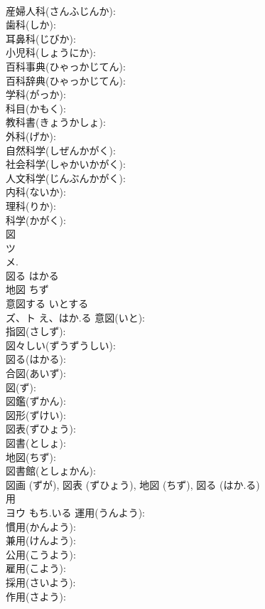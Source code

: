 \documentclass[8pt]{extreport}
\begin{document}
\begin{CJK}{UTF8}{min}
\\	産婦人科(さんふじんか): 
\\	歯科(しか): 
\\	耳鼻科(じびか): 
\\	小児科(しょうにか): 
\\	百科事典(ひゃっかじてん): 
\\	百科辞典(ひゃっかじてん): 
\\	学科(がっか): 
\\	科目(かもく): 
\\	教科書(きょうかしょ): 
\\	外科(げか): 
\\	自然科学(しぜんかがく): 
\\	社会科学(しゃかいかがく): 
\\	人文科学(じんぶんかがく): 
\\	内科(ないか): 
\\	理科(りか): 
\\	科学(かがく): 
\\	図			
\\	ツ 
\\	メ. 
\\	図る はかる 
\\	地図 ちず 
\\	意図する いとする 
\\	ズ、ト	え、はか.る	意図(いと): 
\\	指図(さしず): 
\\	図々しい(ずうずうしい): 
\\	図る(はかる): 
\\	合図(あいず): 
\\	図(ず): 
\\	図鑑(ずかん): 
\\	図形(ずけい): 
\\	図表(ずひょう): 
\\	図書(としょ): 
\\	地図(ちず): 
\\	図書館(としょかん): 
\\	図画 (ずが), 図表 (ずひょう), 地図 (ちず), 図る (はか.る)
\\	用			
\\	ヨウ	もち.いる	運用(うんよう): 
\\	慣用(かんよう): 
\\	兼用(けんよう): 
\\	公用(こうよう): 
\\	雇用(こよう): 
\\	採用(さいよう): 
\\	作用(さよう): 

\end{CJK}
\end{document}
